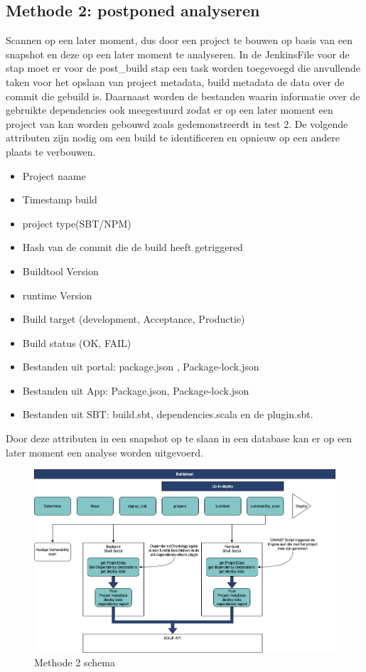 \subsection{Methode 2: postponed analyseren}
Scannen op een later moment, dus door een project te bouwen op basis van een snapshot en deze op een later moment te analyseren.
In de JenkinsFile voor de stap moet er voor de post\_build stap een task worden toegevoegd die anvullende taken voor het opslaan van project metadata, build metadata de data over de commit die gebuild is. Daarnaast worden de bestanden waarin informatie over de gebruikte dependencies ook meegestuurd zodat er op een later moment een project van kan worden gebouwd zoals gedemonstreerdt in test 2.
De volgende attributen zijn nodig om een build te identificeren en opnieuw op een andere plaats te verbouwen.
\begin{itemize}
    \item Project naame
    \item Timestamp build
    \item project type(SBT/NPM)
    \item Hash van de commit die de build heeft getriggered
    \item Buildtool Version
    \item runtime Version
    \item Build target (development, Acceptance, Productie)
    \item Build status (OK, FAIL)
    \item Bestanden uit portal: package.json , Package-lock.json
    \item Bestanden uit App: Package.json, Package-lock.json
    \item Bestanden uit SBT: build.sbt, dependencies.scala en de plugin.sbt.
\end{itemize}
Door deze attributen in een snapshot op te slaan in een database kan er op een later moment een analyse worden uitgevoerd.

\begin{figure}[bth]
    \myfloatalign
    \includegraphics[width=15cm]{gfx/Methode_2}
    \caption{Methode 2 schema}
    \label{fig:methode2Schema}
\end{figure}

